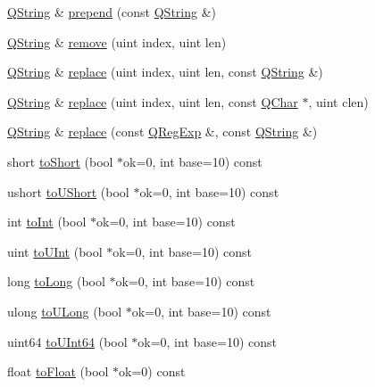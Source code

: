 \begin{DoxyCompactItemize}
\item 
\mbox{\hyperlink{class_q_string}{Q\+String}} \& \mbox{\hyperlink{class_q_string_a105a5d5c7d527ecdc01b0e3e34edfc52}{prepend}} (const \mbox{\hyperlink{class_q_string}{Q\+String}} \&)
\item 
\mbox{\hyperlink{class_q_string}{Q\+String}} \& \mbox{\hyperlink{class_q_string_afd08aabf1d9b04a3fef298290af04cbd}{remove}} (uint index, uint len)
\item 
\mbox{\hyperlink{class_q_string}{Q\+String}} \& \mbox{\hyperlink{class_q_string_aa785aa8e254ae8704f1a960245f3337e}{replace}} (uint index, uint len, const \mbox{\hyperlink{class_q_string}{Q\+String}} \&)
\item 
\mbox{\hyperlink{class_q_string}{Q\+String}} \& \mbox{\hyperlink{class_q_string_a61605f13535774a3b048370a04aff78c}{replace}} (uint index, uint len, const \mbox{\hyperlink{class_q_char}{Q\+Char}} $\ast$, uint clen)
\item 
\mbox{\hyperlink{class_q_string}{Q\+String}} \& \mbox{\hyperlink{class_q_string_aaee914b4744ada084543c212bc1b3a21}{replace}} (const \mbox{\hyperlink{class_q_reg_exp}{Q\+Reg\+Exp}} \&, const \mbox{\hyperlink{class_q_string}{Q\+String}} \&)
\item 
short \mbox{\hyperlink{class_q_string_aba480e0d80d25f65e2acebb03d0d7ab5}{to\+Short}} (bool $\ast$ok=0, int base=10) const
\item 
ushort \mbox{\hyperlink{class_q_string_a1ef1df5d1b79c0bd01115f39078f1334}{to\+U\+Short}} (bool $\ast$ok=0, int base=10) const
\item 
int \mbox{\hyperlink{class_q_string_a98f691fb039c264a986142c833223efc}{to\+Int}} (bool $\ast$ok=0, int base=10) const
\item 
uint \mbox{\hyperlink{class_q_string_abe1e887f24348b6b7ef69b7036707b6b}{to\+U\+Int}} (bool $\ast$ok=0, int base=10) const
\item 
long \mbox{\hyperlink{class_q_string_a3b79d2babc06fcbaec011fd9113e75ab}{to\+Long}} (bool $\ast$ok=0, int base=10) const
\item 
ulong \mbox{\hyperlink{class_q_string_aad9a32a624e392837a639b418f243c67}{to\+U\+Long}} (bool $\ast$ok=0, int base=10) const
\item 
uint64 \mbox{\hyperlink{class_q_string_a3f39cb56a6f77eabc5e3e81cb483fabc}{to\+U\+Int64}} (bool $\ast$ok=0, int base=10) const
\item 
float \mbox{\hyperlink{class_q_string_a42b5e7fb62765d02dae680c179e402e8}{to\+Float}} (bool $\ast$ok=0) const
\item 

\end{DoxyCompactItemize}
